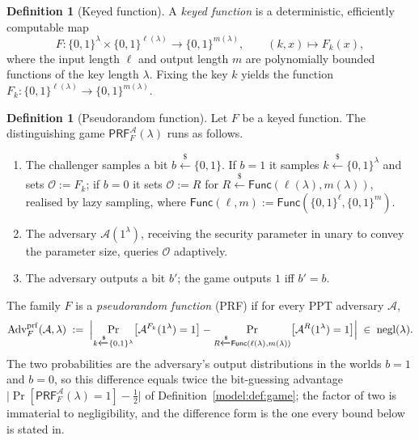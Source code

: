 \documentclass[11pt,a4paper]{article}
\theoremstyle{definition}
\newtheorem{definition}[theorem]{Definition}
\theoremstyle{remark}
\DeclareMathOperator{\negl}{negl}
\begin{document}
\begin{definition}[Keyed function]\label{prf:def:keyed}
A \emph{keyed function} is a deterministic, efficiently computable map
\[
F \colon \{0,1\}^{\lambda} \times \{0,1\}^{\ell(\lambda)}
  \longrightarrow \{0,1\}^{m(\lambda)},
\qquad
(k, x) \longmapsto F_{k}(x),
\]
where the input length \(\ell\) and output length \(m\) are
polynomially bounded functions of the key length \(\lambda\). Fixing
the key \(k\) yields the function
\(F_{k} \colon \{0,1\}^{\ell(\lambda)} \to \{0,1\}^{m(\lambda)}\).
\end{definition}

\begin{definition}[Pseudorandom function]\label{prf:def:prf}
Let \(F\) be a keyed function. The distinguishing game
\(\mathsf{PRF}^{\mathcal{A}}_{F}(\lambda)\) runs as follows.
\begin{enumerate}
\item The challenger samples a bit \(b \xleftarrow{\$} \{0,1\}\). If
  \(b = 1\) it samples \(k \xleftarrow{\$} \{0,1\}^{\lambda}\) and
  sets \(\mathcal{O} := F_{k}\); if \(b = 0\) it sets
  \(\mathcal{O} := R\) for
  \(R \xleftarrow{\$} \mathsf{Func}(\ell(\lambda), m(\lambda))\),
  realised by lazy sampling, where
  \(\mathsf{Func}(\ell, m) :=
  \mathsf{Func}(\{0,1\}^{\ell}, \{0,1\}^{m})\).
\item The adversary \(\mathcal{A}(1^{\lambda})\), receiving the
  security parameter in unary to convey the parameter size, queries
  \(\mathcal{O}\) adaptively.
\item The adversary outputs a bit \(b'\); the game outputs \(1\) iff
  \(b' = b\).
\end{enumerate}
The family \(F\) is a \emph{pseudorandom function} (PRF) if for every
PPT adversary \(\mathcal{A}\),
\[
\mathrm{Adv}^{\mathrm{prf}}_{F}(\mathcal{A}, \lambda)
\;:=\;
\Bigl|
\Pr_{k \xleftarrow{\$} \{0,1\}^{\lambda}}
  \bigl[\mathcal{A}^{F_{k}}(1^{\lambda}) = 1\bigr]
-
\Pr_{R \xleftarrow{\$} \mathsf{Func}(\ell(\lambda), m(\lambda))}
  \bigl[\mathcal{A}^{R}(1^{\lambda}) = 1\bigr]
\Bigr|
\;\in\; \negl(\lambda).
\]
The two probabilities are the adversary's output distributions in the
worlds \(b = 1\) and \(b = 0\), so this difference equals twice the
bit-guessing advantage
\(\bigl|\Pr[\mathsf{PRF}^{\mathcal{A}}_{F}(\lambda) = 1] -
\tfrac{1}{2}\bigr|\) of Definition~\ref{model:def:game}; the factor
of two is immaterial to negligibility, and the difference form is the
one every bound below is stated in.
\end{definition}
\end{document}
